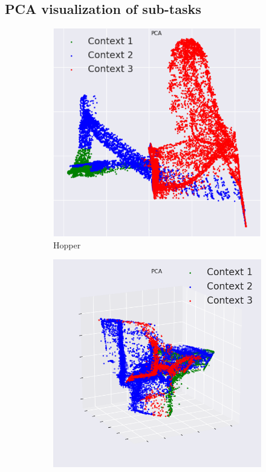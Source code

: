 \documentclass{article} %
\begin{document}
\subsection{PCA visualization of sub-tasks} \label{sec:appendix_pca}
\begin{figure}
    \centering
    \begin{subfigure}{0.33\columnwidth}
    \centering
    \includegraphics[scale=0.17]{figures/pca/pca_hopper_expert.png}
    \caption{Hopper}
    \end{subfigure}%
    \centering
    \begin{subfigure}{0.33\columnwidth}
    \centering
    \includegraphics[scale=0.17]{figures/pca/pca_walker_expert_2.png}

\end{subfigure}
\end{figure}
\end{document}
